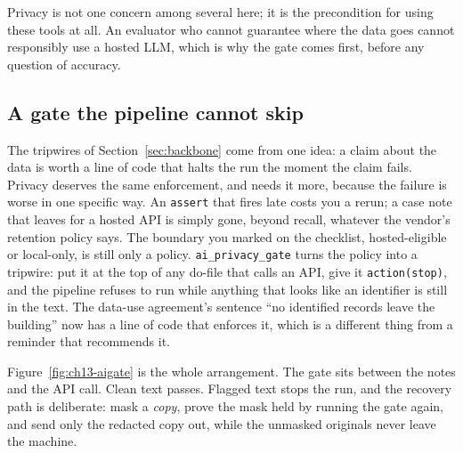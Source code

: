 \documentclass[
    a4paper,
    fontsize=10pt,
    twoside=true,
    numbers=noenddot,
]{kaobook}
\begin{document}
Privacy is not one concern among several here; it is the precondition for using these tools at all. An evaluator who cannot guarantee where the data goes cannot responsibly use a hosted LLM, which is why the gate comes first, before any question of accuracy.

\subsection{A gate the pipeline cannot skip}\label{sec:ch13-aigate}
The tripwires of Section~\ref{sec:backbone} come from one idea: a claim about the data is worth a line of code that halts the run the moment the claim fails. Privacy deserves the same enforcement, and needs it more, because the failure is worse in one specific way. An \texttt{assert} that fires late costs you a rerun; a case note that leaves for a hosted API is simply gone, beyond recall, whatever the vendor's retention policy says. The boundary you marked on the checklist, hosted-eligible or local-only, is still only a policy. \texttt{ai\_privacy\_gate} turns the policy into a tripwire: put it at the top of any do-file that calls an API, give it \texttt{action(stop)}, and the pipeline refuses to run while anything that looks like an identifier is still in the text. The data-use agreement's sentence \enquote{no identified records leave the building} now has a line of code that enforces it, which is a different thing from a reminder that recommends it.

Figure~\ref{fig:ch13-aigate} is the whole arrangement. The gate sits between the notes and the API call. Clean text passes. Flagged text stops the run, and the recovery path is deliberate: mask a \emph{copy}, prove the mask held by running the gate again, and send only the redacted copy out, while the unmasked originals never leave the machine.
\end{document}

